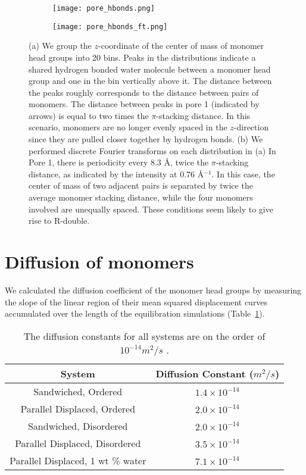   \begin{figure}[!htb]
  \centering
  \begin{subfigure}{0.45\textwidth}
  \texttt{[image: pore\_hbonds.png]}
  \caption{}\label{S-fig:pore_hbonds}
  \end{subfigure}
  \begin{subfigure}{0.45\textwidth}
  \texttt{[image: pore\_hbonds\_ft.png]}
  \caption{}\label{S-fig:pore_hbonds_ft}
  \end{subfigure}
  \caption{(a) We group the $z$-coordinate of the center of mass of monomer
  head groups into 20 bins. Peaks in the distributions indicate a shared hydrogen bonded
  water molecule between a monomer head group and one in the bin vertically above it. 
  The distance between the peaks roughly corresponds to the distance between pairs of 
  monomers. The distance between peaks in pore 1 (indicated by arrows) is equal to two 
  times the $\pi$-stacking distance. In this scenario, monomers are no longer evenly spaced
  in the $z$-direction since they are pulled closer together by hydrogen bonds. (b) We 
  performed discrete Fourier transforms on each distribution in (a) In Pore 1, there 
  is periodicity every 8.3 \AA, twice the $\pi$-stacking distance, as indicated by the
  intensity at 0.76 \AA$^{-1}$. In this case, the center of mass of two adjacent pairs 
  is separated by twice the average monomer stacking distance, while the four monomers 
  involved are unequally spaced. These conditions seem likely to give rise to R-double.
  }\label{S-fig:hbonds}
  \end{figure}
  
  \clearpage
  
  \section{Diffusion of monomers}

  We calculated the diffusion coefficient of the monomer head groups by measuring
  the slope of the linear region of their mean squared displacement curves accumulated
  over the length of the equilibration simulations (Table~\ref{S-table:msd}). 
  
  \begin{table}[h]
  \centering
  \begin{tabular}{cc}
  \hline
  System & Diffusion Constant ($m^2/s$) \\ 
  \hline
  Sandwiched, Ordered & $1.4 \times 10^{-14}$ \\
  Parallel Displaced, Ordered & $2.0 \times 10^{-14}$ \\
  Sandwiched, Disordered & $2.0 \times 10^{-14}$ \\
  Parallel Displaced, Disordered & $3.5 \times 10^{-14}$ \\
  Parallel Displaced, 1 wt \% water & $7.1 \times 10^{-14}$ \\
  \hline
  \end{tabular}
  \caption{The diffusion constants for all systems are on the order of $10^{-14} m^2/s$ 
  .}~\label{S-table:msd}
  \end{table}
  
